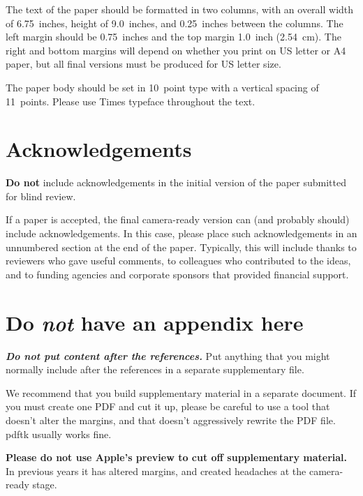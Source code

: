 \documentclass{article}
\begin{document}
The text of the paper should be formatted in two columns, with an
overall width of 6.75~inches, height of 9.0~inches, and 0.25~inches
between the columns. The left margin should be 0.75~inches and the top
margin 1.0~inch (2.54~cm). The right and bottom margins will depend on
whether you print on US letter or A4 paper, but all final versions
must be produced for US letter size.

The paper body should be set in 10~point type with a vertical spacing
of 11~points. Please use Times typeface throughout the text.


\section*{Acknowledgements}

\textbf{Do not} include acknowledgements in the initial version of
the paper submitted for blind review.

If a paper is accepted, the final camera-ready version can (and
probably should) include acknowledgements. In this case, please
place such acknowledgements in an unnumbered section at the
end of the paper. Typically, this will include thanks to reviewers
who gave useful comments, to colleagues who contributed to the ideas,
and to funding agencies and corporate sponsors that provided financial
support.


\nocite{langley00}





\appendix
\section{Do \emph{not} have an appendix here}

\textbf{\emph{Do not put content after the references.}}
%
Put anything that you might normally include after the references in a separate
supplementary file.

We recommend that you build supplementary material in a separate document.
If you must create one PDF and cut it up, please be careful to use a tool that
doesn't alter the margins, and that doesn't aggressively rewrite the PDF file.
pdftk usually works fine. 

\textbf{Please do not use Apple's preview to cut off supplementary material.} In
previous years it has altered margins, and created headaches at the camera-ready
stage. 
\end{document}
